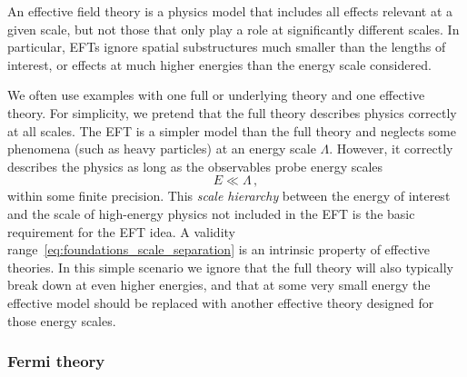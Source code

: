 An effective field theory is a physics model that includes all effects
relevant at a given scale, but not those that only play a role at
significantly different scales. In particular, EFTs ignore spatial
substructures much smaller than the lengths of interest, or effects at
much higher energies than the energy scale considered.

We often use examples with one full or underlying theory and
one effective theory. For simplicity, we pretend that the full theory
describes physics correctly at all scales. The EFT is a simpler model
than the full theory and neglects some phenomena (such as heavy
particles) at an energy scale $\Lambda$. However, it correctly describes
the physics as long as the observables probe energy scales
%
\begin{equation}
  E \ll \Lambda \,,
  \label{eq:foundations_scale_separation}
\end{equation}
%
within some finite precision. This \emph{scale hierarchy} between the
energy of interest and the scale of high-energy physics not included
in the EFT is the basic requirement for the EFT idea. A validity
range~\eqref{eq:foundations_scale_separation} is an intrinsic
property of effective theories. In this simple scenario we ignore that the full
theory will also typically break down at even higher energies, and
that at some very small energy the effective model should be replaced
with another effective theory designed for those energy scales.



\subsubsection{Fermi theory}

